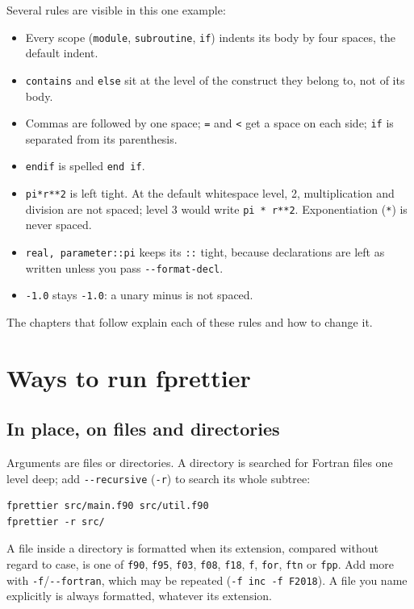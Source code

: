\documentclass[11pt,a4paper,openany]{book}
\newcommand{\code}[1]{\texttt{\small #1}}
\newcommand{\flag}[1]{\texttt{\small -{}-#1}}
\begin{document}
Several rules are visible in this one example:

\begin{itemize}
  \item Every scope (\code{module}, \code{subroutine}, \code{if}) indents its
    body by four spaces, the default indent.
  \item \code{contains} and \code{else} sit at the level of the construct they
    belong to, not of its body.
  \item Commas are followed by one space; \code{=} and \code{<} get a space on
    each side; \code{if} is separated from its parenthesis.
  \item \code{endif} is spelled \code{end if}.
  \item \code{pi*r**2} is left tight. At the default whitespace level, 2,
    multiplication and division are not spaced; level 3 would write
    \code{pi * r**2}. Exponentiation (\code{**}) is never spaced.
  \item \code{real, parameter::pi} keeps its \code{::} tight, because
    declarations are left as written unless you pass \flag{format-decl}.
  \item \code{-1.0} stays \code{-1.0}: a unary minus is not spaced.
\end{itemize}

The chapters that follow explain each of these rules and how to change it.

\section{Ways to run fprettier}

\subsection{In place, on files and directories}

Arguments are files or directories. A directory is searched for Fortran files
one level deep; add \flag{recursive} (\code{-r}) to search its whole subtree:

\begin{lstlisting}[style=shell]
fprettier src/main.f90 src/util.f90
fprettier -r src/
\end{lstlisting}

A file inside a directory is formatted when its extension, compared without
regard to case, is one of \code{f90}, \code{f95}, \code{f03}, \code{f08},
\code{f18}, \code{f}, \code{for}, \code{ftn} or \code{fpp}. Add more with
\code{-f}/\flag{fortran}, which may be repeated (\code{-f inc -f F2018}). A
file you name explicitly is always formatted, whatever its extension.
\end{document}
